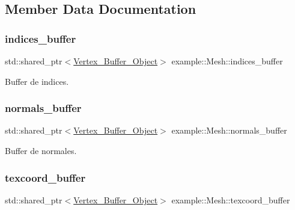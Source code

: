 \subsection{Member Data Documentation}
\mbox{\label{classexample_1_1_mesh_ac61fd0883693b544b3f9d684f4c38e9a}} 
\subsubsection{\texorpdfstring{indices\_buffer}{indices\_buffer}}
{\footnotesize\ttfamily std\+::shared\+\_\+ptr$<$\mbox{\hyperlink{classexample_1_1_vertex___buffer___object}{Vertex\+\_\+\+Buffer\+\_\+\+Object}}$>$ example\+::\+Mesh\+::indices\+\_\+buffer\hspace{0.3cm}{\ttfamily [protected]}}



Buffer de indices. 

\mbox{\label{classexample_1_1_mesh_a64ef7d61c1124e69d7f178cffaa42523}} 
\subsubsection{\texorpdfstring{normals\_buffer}{normals\_buffer}}
{\footnotesize\ttfamily std\+::shared\+\_\+ptr$<$\mbox{\hyperlink{classexample_1_1_vertex___buffer___object}{Vertex\+\_\+\+Buffer\+\_\+\+Object}}$>$ example\+::\+Mesh\+::normals\+\_\+buffer\hspace{0.3cm}{\ttfamily [protected]}}



Buffer de normales. 

\mbox{\label{classexample_1_1_mesh_a86a174c1c48a93217f52b5c3831e85c8}} 
\subsubsection{\texorpdfstring{texcoord\_buffer}{texcoord\_buffer}}
{\footnotesize\ttfamily std\+::shared\+\_\+ptr$<$\mbox{\hyperlink{classexample_1_1_vertex___buffer___object}{Vertex\+\_\+\+Buffer\+\_\+\+Object}}$>$ example\+::\+Mesh\+::texcoord\+\_\+buffer\hspace{0.3cm}{\ttfamily [protected]}}



